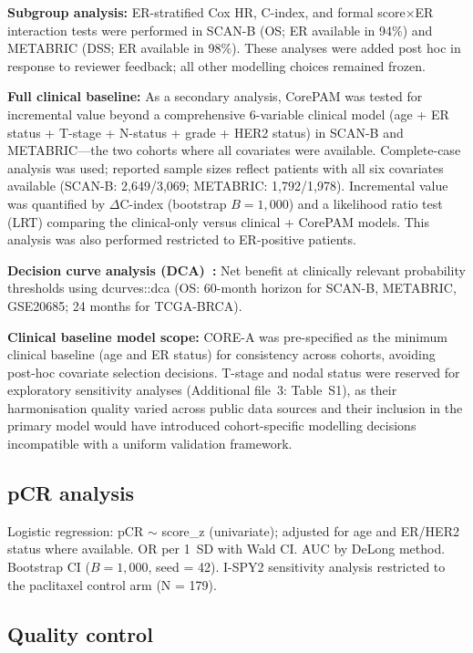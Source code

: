 \documentclass[referee,lineno,pdflatex,sn-vancouver-num]{sn-jnl}
\begin{document}
\textbf{Subgroup analysis:} ER-stratified Cox HR, C-index, and formal score$\times$ER interaction tests were performed in SCAN-B (OS; ER available in 94\%) and METABRIC (DSS; ER available in 98\%). These analyses were added post hoc in response to reviewer feedback; all other modelling choices remained frozen.

\textbf{Full clinical baseline:} As a secondary analysis, CorePAM was tested for incremental value beyond a comprehensive 6-variable clinical model (age + ER status + T-stage + N-status + grade + HER2 status) in SCAN-B and METABRIC---the two cohorts where all covariates were available. Complete-case analysis was used; reported sample sizes reflect patients with all six covariates available (SCAN-B: 2,649/3,069; METABRIC: 1,792/1,978). Incremental value was quantified by $\Delta$C-index (bootstrap $B = 1{,}000$) and a likelihood ratio test (LRT) comparing the clinical-only versus clinical + CorePAM models. This analysis was also performed restricted to ER-positive patients.

\textbf{Decision curve analysis (DCA)~\cite{vickers2006}:} Net benefit at clinically relevant probability thresholds using dcurves::dca (OS: 60-month horizon for SCAN-B, METABRIC, GSE20685; 24 months for TCGA-BRCA).

\textbf{Clinical baseline model scope:} CORE-A was pre-specified as the minimum clinical baseline (age and ER status) for consistency across cohorts, avoiding post-hoc covariate selection decisions. T-stage and nodal status were reserved for exploratory sensitivity analyses (Additional file~3: Table~S1), as their harmonisation quality varied across public data sources and their inclusion in the primary model would have introduced cohort-specific modelling decisions incompatible with a uniform validation framework.

\subsection{pCR analysis}\label{subsec:pcr-analysis}

Logistic regression: pCR $\sim$ score\_z (univariate); adjusted for age and ER/HER2 status where available. OR per 1~SD with Wald CI. AUC by DeLong method. Bootstrap CI ($B = 1{,}000$, seed = 42). I-SPY2 sensitivity analysis restricted to the paclitaxel control arm (N = 179).

\subsection{Quality control}\label{subsec:quality-control}
\end{document}
